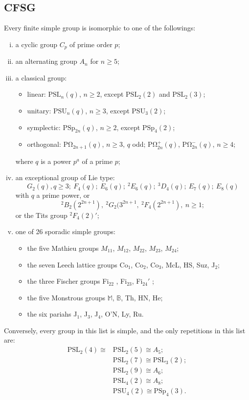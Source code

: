 \documentclass[a4,11pt]{article}
\def\PSL{\mathrm{PSL}}
\def\PSU{\mathrm{PSU}}
\def\PSp{\mathrm{PSp}}
\def\PO{\mathrm{P\Omega}}
\def\PSL{\mathrm{PSL}}
\begin{document}
\subsection{CFSG}
Every finite simple group is isomorphic to one of the followings:
\begin{enumerate}[(i)]
	\item a cyclic group $C_p$ of prime order $p$;
	\item an alternating group $A_n$ for $n\geq 5$;
	\item a classical group:
		\begin{itemize}
			\item linear: $\PSL_n(q)$, $n\geq 2$, except $\PSL_2(2)$ and $\PSL_2(3)$;
			\item unitary: $\PSU_n(q)$, $n\geq 3$, except $\PSU_3(2)$;
			\item symplectic: $\PSp_{2n}(q)$, $n\geq 2$, except $\PSp_4(2)$;
			\item orthogonal: $\PO_{2n+1}(q)$, $n\geq 3$, $q$ odd; $\PO_{2n}^+(q)$, $\PO_{2n}^-(q)$, $n\geq 4$;
		\end{itemize}
		where $q$ is a power $p^a$ of a prime $p$;
	\item an exceptional group of Lie type:
		\[ G_2(q),q\geq 3;\ F_4(q);\ E_6(q);\  ^2E_6(q);\ ^3D_4(q);\ E_7(q);\ E_8(q) \] with $q$ a prime power, or\[ ^2B_2(2^{2n+1}),\  ^2G_2(3^{2n+1},\ ^2F_4(2^{2n+1}),\ n\geq 1; \]or the Tits group $^2F_4(2)'$;
	\item one of 26 sporadic simple groups:
		\begin{itemize}
			\item the five Mathieu groups $M_{11}$, $M_{12}$, $M_{22}$, $M_{23}$, $M_{24}$;
			\item the seven Leech lattice groups Co$_1$, Co$_2$, Co$_3$, McL, HS, Suz, J$_2$;
			\item the three Fischer groups Fi$_{22}$ , Fi$_{23}$, Fi$_{24}'$ ;
			\item the five Monstrous groups $\mathbb{M}$, $\mathbb{B}$, Th, HN, He;
			\item the six pariahs J$_1$, J$_3$, J$_4$, O'N, Ly, Ru.
		\end{itemize}
\end{enumerate}
Conversely, every group in this list is simple, and the only repetitions in this list are:
\begin{equation*}
\begin{aligned}
	\PSL_2(4)\cong &\PSL_2(5)\cong A_5;\\
	&\PSL_2(7)\cong\PSL_3(2);\\
	&\PSL_2(9)\cong A_6;\\
	&\PSL_4(2)\cong A_8;\\
	&\PSU_4(2)\cong \PSp_4(3).
\end{aligned}
\end{equation*}
\end{document}
